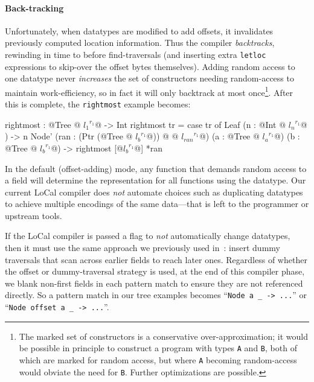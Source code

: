 \documentclass[showabstract,showacknowledgments,showpreface,showdedication,school]{iuphd}
\makeatletter
\theoremstyle{nonumberplain}
\newcommand{\locreg}[2]{\ensuremath{{#1}^{#2}}}
\newcommand{\tyatlocreg}[3]{#1 \ensuremath{@} \locreg{#2}{#3}}
\newcommand{\il}[1]{\lstinline[style=inline,mathescape=true];#1;}
\makeatother
\begin{document}
\paragraph{Back-tracking}
Unfortunately, when datatypes are modified to add offsets, it invalidates
previously computed location information.  Thus the compiler {\em backtracks},
rewinding in time to before find-traversals (and inserting extra \il{letloc}
expressions to skip-over the offset bytes themselves).
Adding random access to one datatype never \emph{increases} the set of
constructors needing random-access to maintain work-efficiency, so in fact it will
only backtrack at most once\footnote{The marked set of constructors
  is a conservative over-approximation; it would be possible in principle to
  construct a program with types \il{A} and \il{B}, both of which are marked for
  random access, but where \il{A} becoming random-access would obviate the need
  for \il{B}.  Further optimizations are possible.}.
After this is complete, the \il{rightmost} example becomes:
\begin{code}
rightmost : @\tyatlocreg{Tree}{l_{1}}{r_1}@ -> Int
rightmost tr =
 case tr of
   Leaf (n : @\tyatlocreg{Int}{l_n}{r_1}@ ) -> n
   Node' (ran : (Ptr (@\tyatlocreg{Tree}{l_b}{r_1}@)) @\tyatlocreg{}{l_{ran}}{r_1}@)
         (a : @\tyatlocreg{Tree}{l_a}{r_1}@) (b : @\tyatlocreg{Tree}{l_b}{r_1}@)
      -> rightmost [@\locreg{l_{b}}{r_1}@] *ran
\end{code}


In the default (offset-adding) mode, any function that demands random access to
a field will determine the representation for all functions using the
datatype.
Our current LoCal compiler does \emph{not} automate choices such as duplicating
datatypes to achieve multiple encodings of the same data---that is left to the
programmer or upstream tools.

If the LoCal compiler is passed a flag to {\em not} automatically change
datatypes, then it must use the same approach we previously used in~\cite{ecoop17-gibbon}:
insert {dummy traversals} that scan across earlier
fields to reach later ones.
Regardless of whether the offset or dummy-traversal strategy is used,
at the end of this compiler phase, we blank non-first fields in
each pattern match to ensure they are not referenced directly.
So a pattern match in our tree examples becomes
 ``\il{Node a _ -> ...}'' or   ``\il{Node offset a _ -> ...}''.
\end{document}
